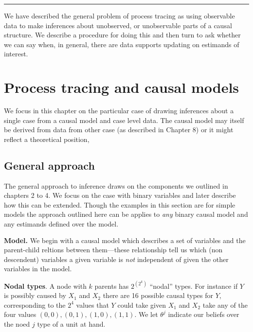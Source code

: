 \documentclass[12pt,]{book}
\begin{document}
\begin{center}\rule{0.5\linewidth}{\linethickness}\end{center}

We have described the general problem of process tracing as using observable data to make inferences about unobserved, or unobservable parts of a causal structure. We describe a procedure for doing this and then turn to ask whether we can say when, in general, there are data supports updating on estimands of interest.

\hypertarget{process-tracing-and-causal-models}{%
\section{Process tracing and causal models}\label{process-tracing-and-causal-models}}

We focus in this chapter on the particular case of drawing inferences about a single case from a causal model and case level data. The causal model may itself be derived from data from other case (as described in Chapter 8) or it might reflect a theoretical position,

\hypertarget{general-approach}{%
\subsection{General approach}\label{general-approach}}

The general approach to inference draws on the components we outlined in chapters 2 to 4. We focus on the case with binary variables and later describe how this can be extended. Though the examples in this section are for simple models the approach outlined here can be applies to \emph{any} binary causal model and any estimands defined over the model.

\textbf{Model.} We begin with a causal model which describes a set of variables and the parent-child reltions between them---these relationship tell us which (non descendent) variables a given variable is \emph{not} independent of given the other variables in the model.

\textbf{Nodal types}. A node with \(k\) parents has \(2^{\left(2^k\right)}\) ``nodal'' types. For instance if \(Y\) is possibly caused by \(X_1\) and \(X_2\) there are 16 possible causal types for \(Y\), corresponding to the \(2^4\) values that \(Y\) could take given \(X_1\) and \(X_2\) take any of the four values \((0,0), (0,1), (1,0), (1,1)\). We let \(\theta^j\) indicate our beliefs over the noed \(j\) type of a unit at hand.
\end{document}
